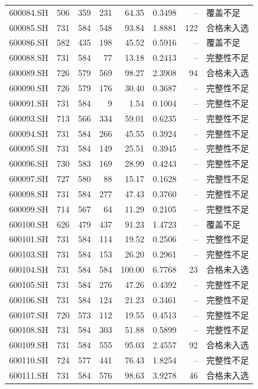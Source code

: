 \documentclass[10pt,a4paper]{article}
\begin{document}
\begin{longtable}{lrrr r r r l}
600084.SH & 506 & 359 & 231 & 64.35 & 0.3498 & -- & 覆盖不足\\
600085.SH & 731 & 584 & 548 & 93.84 & 1.8881 & 122 & 合格未入选\\
600086.SH & 582 & 435 & 198 & 45.52 & 0.5916 & -- & 覆盖不足\\
600088.SH & 731 & 584 & 77 & 13.18 & 0.2413 & -- & 完整性不足\\
600089.SH & 726 & 579 & 569 & 98.27 & 2.3908 & 94 & 合格未入选\\
600090.SH & 726 & 579 & 176 & 30.40 & 0.3687 & -- & 完整性不足\\
600091.SH & 731 & 584 & 9 & 1.54 & 0.1004 & -- & 完整性不足\\
600093.SH & 713 & 566 & 334 & 59.01 & 0.6235 & -- & 完整性不足\\
600094.SH & 731 & 584 & 266 & 45.55 & 0.3924 & -- & 完整性不足\\
600095.SH & 731 & 584 & 149 & 25.51 & 0.3945 & -- & 完整性不足\\
600096.SH & 730 & 583 & 169 & 28.99 & 0.4243 & -- & 完整性不足\\
600097.SH & 727 & 580 & 88 & 15.17 & 0.1628 & -- & 完整性不足\\
600098.SH & 731 & 584 & 277 & 47.43 & 0.3760 & -- & 完整性不足\\
600099.SH & 714 & 567 & 64 & 11.29 & 0.2105 & -- & 完整性不足\\
600100.SH & 626 & 479 & 437 & 91.23 & 1.4723 & -- & 覆盖不足\\
600101.SH & 731 & 584 & 114 & 19.52 & 0.2506 & -- & 完整性不足\\
600103.SH & 731 & 584 & 153 & 26.20 & 0.2961 & -- & 完整性不足\\
600104.SH & 731 & 584 & 584 & 100.00 & 6.7768 & 23 & 合格未入选\\
600105.SH & 731 & 584 & 276 & 47.26 & 0.4392 & -- & 完整性不足\\
600106.SH & 731 & 584 & 124 & 21.23 & 0.3461 & -- & 完整性不足\\
600107.SH & 720 & 573 & 112 & 19.55 & 0.4513 & -- & 完整性不足\\
600108.SH & 731 & 584 & 303 & 51.88 & 0.5899 & -- & 完整性不足\\
600109.SH & 731 & 584 & 555 & 95.03 & 2.4557 & 92 & 合格未入选\\
600110.SH & 724 & 577 & 441 & 76.43 & 1.8254 & -- & 完整性不足\\
600111.SH & 731 & 584 & 576 & 98.63 & 3.9278 & 46 & 合格未入选\\

\end{longtable}
\end{document}
